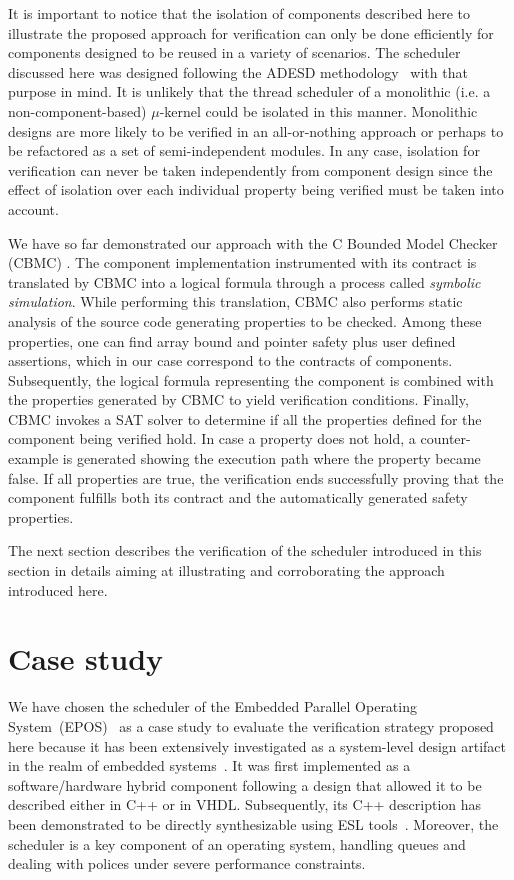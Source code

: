 \documentclass{sig-alternate}
\begin{document}
It is important to notice that the isolation of components described
here to illustrate the proposed approach for verification can only be
done efficiently for components designed to be reused in a variety of
scenarios. The scheduler discussed here was designed following the ADESD
methodology~\cite{Muck:OSR:2012} with that purpose in mind. It is
unlikely that the thread scheduler of a monolithic (i.e.  a
non-component-based) $\mu$-kernel could be isolated in this manner.
Monolithic designs are more likely to be verified in an all-or-nothing
approach or perhaps to be refactored as a set of semi-independent
modules.  In any case, isolation for verification can never be taken
independently from component design since the effect of isolation over
each individual property being verified must be taken into account.

We have so far demonstrated our approach with the C Bound\-ed Model
Checker (CBMC) \cite{Kroehning:CBMC}.  The component implementation
instrumented with its contract is translated by CBMC into a logical
formula through a process called \emph{symbolic
  simulation}\cite{Clarke:2004}.  While performing this translation,
CBMC also performs static analysis of the source code generating
properties to be checked.  Among these properties, one can find array
bound and pointer safety plus user defined assertions, which in our case
correspond to the contracts of components.  Subsequently, the logical
formula representing the component is combined with the properties
generated by CBMC to yield verification conditions.  Finally, CBMC
invokes a SAT solver to determine if all the properties defined for the
component being verified hold.  In case a property does not hold, a
counter-example is generated showing the execution path where the
property became false.  If all properties are true, the verification
ends successfully proving that the component fulfills both its contract
and the automatically generated safety properties.

The next section describes the verification of the scheduler introduced
in this section in details aiming at illustrating and corroborating the
approach introduced here.

\section{Case study} \label{eval}

We have chosen the scheduler of the Embedded Parallel Operating
System~(EPOS)~\cite{Frohlich:2001} as a case study to evaluate the
verification strategy proposed here because it has been extensively
investigated as a system-level design artifact in the realm of embedded
systems~\cite{Marcondes:EPS:2009}. It was first implemented as a
software/hardware hybrid component following a design that allowed it to
be described either in C++ or in VHDL. Subsequently, its C++ description
has been demonstrated to be directly synthesizable using ESL
tools~\cite{Pizani:ICECS:2011}. Moreover, the scheduler is a key
component of an operating system, handling queues and dealing with
polices under severe performance constraints.
\end{document}
